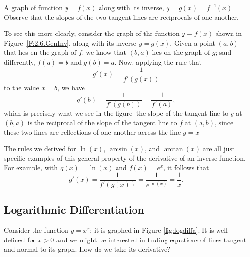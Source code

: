 \begin{marginfigure} %
\caption{A graph of function $y = f(x)$ along with its inverse, $y = g(x) = f^{-1}(x)$.  Observe that the slopes of the two tangent lines are reciprocals of one another.} \label{F:2.6.GenInv}
\end{marginfigure}

To see this more clearly, consider the graph of the function $y = f(x)$ shown in Figure~\ref{F:2.6.GenInv}, along with its inverse $y = g(x)$.  Given a point $(a,b)$ that lies on the graph of $f$, we know that $(b,a)$ lies on the graph of $g$; said differently, $f(a) = b$ and $g(b) = a$.  Now, applying the rule that
$$g'(x) = \frac{1}{f'(g(x))}$$
to the value $x = b$, we have 
$$g'(b) = \frac{1}{f'(g(b))} = \frac{1}{f'(a)},$$
which is precisely what we see in the figure:  the slope of the tangent line to $g$ at $(b,a)$ is the reciprocal of the slope of the tangent line to $f$ at $(a,b)$, since these two lines are reflections of one another across the line $y = x$.


The rules we derived for $\ln(x)$, $\arcsin(x)$, and $\arctan(x)$ are all just specific examples of this general property of the derivative of an inverse function.  For example, with $g(x) = \ln(x)$ and $f(x) = e^x$, it follows that
$$g'(x) = \frac{1}{f'(g(x))} = \frac{1}{e^{\ln(x)}} = \frac{1}{x}.$$


\subsection{Logarithmic Differentiation}

Consider the function $y=x^x$; it is graphed in Figure \ref{fig:logdiffa}. It is well--defined for $x>0$ and we might be interested in finding equations of lines tangent and normal to its graph. How do we take its derivative?


